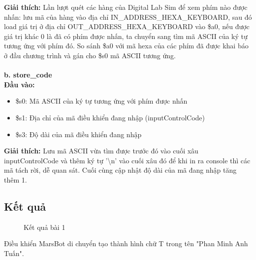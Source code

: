 \documentclass[a4paper,12pt]{article}
\begin{document}
                \textbf{Giải thích:} Lần lượt quét các hàng của Digital Lab Sim để xem phím nào được nhấn: lưu mã của hàng vào địa chỉ IN\_ADDRESS\_HEXA\_KEYBOARD, sau đó load giá trị ở địa chỉ OUT\_ADDRESS\_HEXA\_KEYBOARD vào \$a0, nếu được giá trị khác 0 là đã có phím được nhấn, ta chuyển sang tìm mã ASCII của ký tự tương ứng với phím đó. So sánh \$a0 với mã hexa của các phím đã được khai báo ở đầu chương trình và gán cho \$s0 mã ASCII tương ứng.
                \\ \\
    \textbf{b. store\_code}\\
                \textbf{Đầu vào:}
                \begin{itemize}
                    \item \$s0: Mã ASCII của ký tự tương ứng với phím được nhấn
                    \item \$s1: Địa chỉ của mã điều khiển đang nhập (inputControlCode)
                    \item \$s3: Độ dài của mã điều khiển đang nhập
                \end{itemize}
                \textbf{Giải thích:} Lưu mã ASCII vừa tìm được trước đó vào cuối xâu inputControlCode và thêm ký tự '\textbackslash n' vào cuối xâu đó để khi in ra console thì các mã tách rời, dễ quan sát. Cuối cùng cập nhật độ dài của mã đang nhập tăng thêm 1.
    \clearpage
    \subsection{Kết quả}
    \FloatBarrier
        \begin{figure}[ht!]
    	    \centerline{}
    	    \caption{Kết quả bài 1}
    	    \label{fig:bai100}
        \end{figure}
        \noindent
    Điều khiển MarsBot di chuyển tạo thành hình chữ T trong tên "Phan Minh Anh Tuấn". 
	
\end{document}
